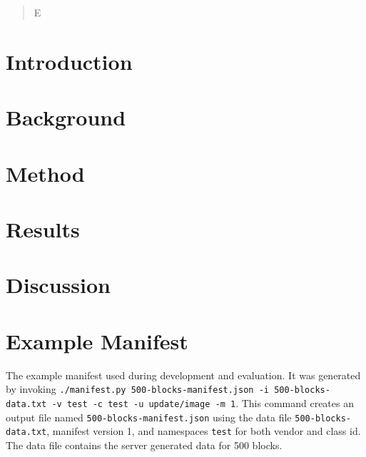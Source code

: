 \documentclass{kththesis}
\begin{document}
\renewcommand{\abstractname}{Acknowledgements}
\begin{abstract}
    E
\end{abstract}

\tableofcontents
\listoftables
\listoffigures
\lstlistoflistings
\printglossaries

\mainmatter


\chapter{Introduction}


\chapter{Background}


\chapter{Method}


\chapter{Results}


\chapter{Discussion}


\printbibliography[heading=bibintoc] %

\appendix

\chapter{Example Manifest}
\label{app:manifest}
The example manifest used during development and evaluation. It was generated by invoking
\texttt{./manifest.py 500-blocks-manifest.json -i 500-blocks-data.txt -v test -c test -u
update/image -m 1}. This command creates an output file named
\texttt{500-blocks-manifest.json} using the data file \texttt{500-blocks-data.txt},
manifest version 1, and namespaces \texttt{test} for both vendor and class id. The data
file contains the server generated data for 500 blocks.
\end{document}
